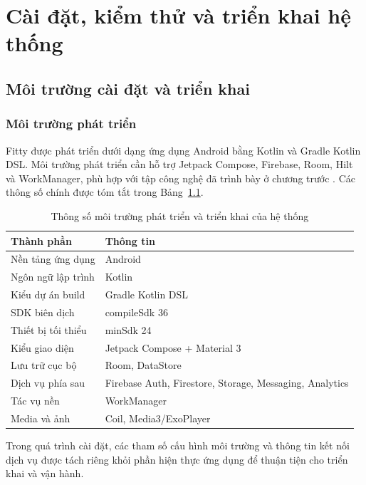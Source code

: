 \chapter{Cài đặt, kiểm thử và triển khai hệ thống}
\label{chap:experiment}

\section{Môi trường cài đặt và triển khai}

\subsection{Môi trường phát triển}

Fitty được phát triển dưới dạng ứng dụng Android bằng Kotlin và Gradle Kotlin DSL. Môi trường phát triển cần hỗ trợ Jetpack Compose, Firebase, Room, Hilt và WorkManager, phù hợp với tập công nghệ đã trình bày ở chương trước \cite{android_jetpack,android_compose,android_hilt,android_room,android_workmanager,firebase_setup}. Các thông số chính được tóm tắt trong Bảng~\ref{tab:dev-environment}.

\begin{table}[H]
\centering
\small
\caption{Thông số môi trường phát triển và triển khai của hệ thống}
\label{tab:dev-environment}
\begin{tabular}{|p{4.3cm}|p{7.8cm}|}
\hline
\textbf{Thành phần} & \textbf{Thông tin} \\ \hline
Nền tảng ứng dụng & Android \\ \hline
Ngôn ngữ lập trình & Kotlin \\ \hline
Kiểu dự án build & Gradle Kotlin DSL \\ \hline
SDK biên dịch & compileSdk 36 \\ \hline
Thiết bị tối thiểu & minSdk 24 \\ \hline
Kiểu giao diện & Jetpack Compose + Material 3 \\ \hline
Lưu trữ cục bộ & Room, DataStore \\ \hline
Dịch vụ phía sau & Firebase Auth, Firestore, Storage, Messaging, Analytics \\ \hline
Tác vụ nền & WorkManager \\ \hline
Media và ảnh & Coil, Media3/ExoPlayer \\ \hline
\end{tabular}
\normalsize
\end{table}

Trong quá trình cài đặt, các tham số cấu hình môi trường và thông tin kết nối dịch vụ được tách riêng khỏi phần hiện thực ứng dụng để thuận tiện cho triển khai và vận hành.

